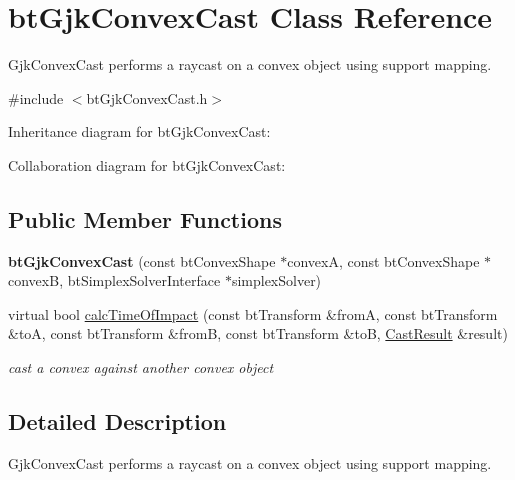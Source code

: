\hypertarget{classbt_gjk_convex_cast}{\section{bt\+Gjk\+Convex\+Cast Class Reference}
\label{classbt_gjk_convex_cast}
}


Gjk\+Convex\+Cast performs a raycast on a convex object using support mapping.  




{\ttfamily \#include $<$bt\+Gjk\+Convex\+Cast.\+h$>$}



Inheritance diagram for bt\+Gjk\+Convex\+Cast\+:


Collaboration diagram for bt\+Gjk\+Convex\+Cast\+:
\subsection*{Public Member Functions}
\begin{DoxyCompactItemize}
\item 
\hypertarget{classbt_gjk_convex_cast_af06c51b46aee3ce90b0034b46897dbed}{{\bfseries bt\+Gjk\+Convex\+Cast} (const bt\+Convex\+Shape $\ast$convex\+A, const bt\+Convex\+Shape $\ast$convex\+B, bt\+Simplex\+Solver\+Interface $\ast$simplex\+Solver)}\label{classbt_gjk_convex_cast_af06c51b46aee3ce90b0034b46897dbed}

\item 
virtual bool \hyperlink{classbt_gjk_convex_cast_a814009e1ebc582495689f365a42ce2c1}{calc\+Time\+Of\+Impact} (const bt\+Transform \&from\+A, const bt\+Transform \&to\+A, const bt\+Transform \&from\+B, const bt\+Transform \&to\+B, \hyperlink{structbt_convex_cast_1_1_cast_result}{Cast\+Result} \&result)
\begin{DoxyCompactList}\small\item\em cast a convex against another convex object \end{DoxyCompactList}\end{DoxyCompactItemize}


\subsection{Detailed Description}
Gjk\+Convex\+Cast performs a raycast on a convex object using support mapping. 

